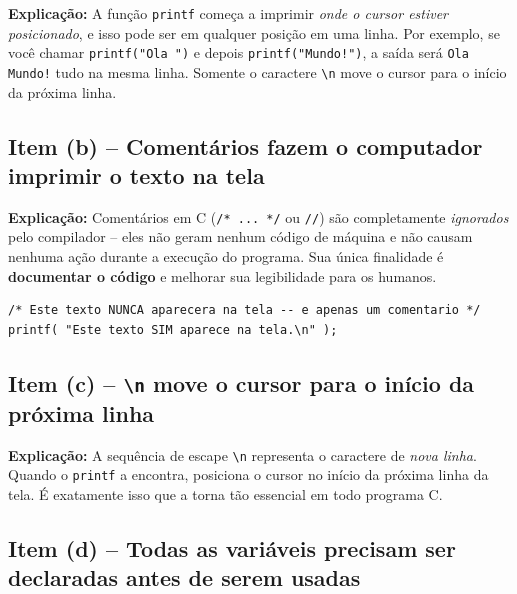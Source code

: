 \documentclass[12pt,a4paper]{article}
\begin{document}
\begin{tcolorbox}[colback=red!5,colframe=deitelred,title={\bfseries FALSO}]
\textbf{Explicação:} A função \texttt{printf} começa a imprimir \textit{onde o cursor
estiver posicionado}, e isso pode ser em qualquer posição em uma linha. Por exemplo, se
você chamar \texttt{printf("Ola ")} e depois \texttt{printf("Mundo!\n")}, a saída será
\texttt{Ola Mundo!} tudo na mesma linha. Somente o caractere \texttt{\textbackslash n}
move o cursor para o início da próxima linha.
\end{tcolorbox}

\subsection*{Item (b) -- Comentários fazem o computador imprimir o texto na tela}

\begin{tcolorbox}[colback=red!5,colframe=deitelred,title={\bfseries FALSO}]
\textbf{Explicação:} Comentários em C (\texttt{/* ... */} ou \texttt{//}) são
completamente \textit{ignorados} pelo compilador -- eles não geram nenhum código de
máquina e não causam nenhuma ação durante a execução do programa. Sua única finalidade
é \textbf{documentar o código} e melhorar sua legibilidade para os humanos.

\begin{lstlisting}
/* Este texto NUNCA aparecera na tela -- e apenas um comentario */
printf( "Este texto SIM aparece na tela.\n" );
\end{lstlisting}
\end{tcolorbox}

\subsection*{Item (c) -- \texttt{\textbackslash n} move o cursor para o início da próxima linha}

\begin{tcolorbox}[colback=green!5,colframe=deitelgreen,title={\bfseries VERDADEIRO}]
\textbf{Explicação:} A sequência de escape \texttt{\textbackslash n} representa o caractere
de \textit{nova linha}. Quando o \texttt{printf} a encontra, posiciona o cursor no início
da próxima linha da tela. É exatamente isso que a torna tão essencial em todo programa C.
\end{tcolorbox}

\subsection*{Item (d) -- Todas as variáveis precisam ser declaradas antes de serem usadas}
\end{document}
